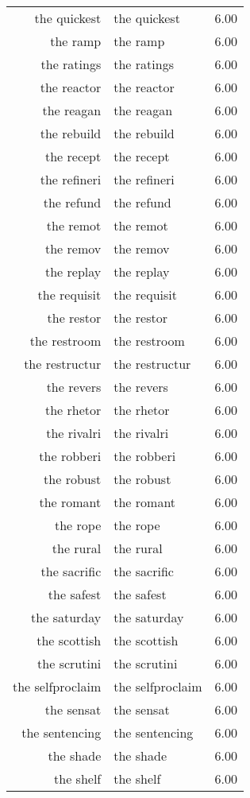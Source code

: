 \begin{table}[ht]
\begin{tabular}{rlr}
  the quickest & the quickest & 6.00 \\ 
  the ramp & the ramp & 6.00 \\ 
  the ratings & the ratings & 6.00 \\ 
  the reactor & the reactor & 6.00 \\ 
  the reagan & the reagan & 6.00 \\ 
  the rebuild & the rebuild & 6.00 \\ 
  the recept & the recept & 6.00 \\ 
  the refineri & the refineri & 6.00 \\ 
  the refund & the refund & 6.00 \\ 
  the remot & the remot & 6.00 \\ 
  the remov & the remov & 6.00 \\ 
  the replay & the replay & 6.00 \\ 
  the requisit & the requisit & 6.00 \\ 
  the restor & the restor & 6.00 \\ 
  the restroom & the restroom & 6.00 \\ 
  the restructur & the restructur & 6.00 \\ 
  the revers & the revers & 6.00 \\ 
  the rhetor & the rhetor & 6.00 \\ 
  the rivalri & the rivalri & 6.00 \\ 
  the robberi & the robberi & 6.00 \\ 
  the robust & the robust & 6.00 \\ 
  the romant & the romant & 6.00 \\ 
  the rope & the rope & 6.00 \\ 
  the rural & the rural & 6.00 \\ 
  the sacrific & the sacrific & 6.00 \\ 
  the safest & the safest & 6.00 \\ 
  the saturday & the saturday & 6.00 \\ 
  the scottish & the scottish & 6.00 \\ 
  the scrutini & the scrutini & 6.00 \\ 
  the selfproclaim & the selfproclaim & 6.00 \\ 
  the sensat & the sensat & 6.00 \\ 
  the sentencing & the sentencing & 6.00 \\ 
  the shade & the shade & 6.00 \\ 
  the shelf & the shelf & 6.00 \\ 

\end{tabular}
\end{table}
